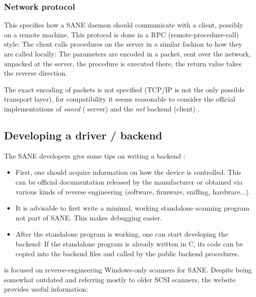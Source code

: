 \documentclass{article}
\begin{document}
\cite[4.4]{sane_standard}

\subsubsection{Network protocol}

This specifies how a SANE daemon should communicate with a client, possibly on a
remote machine. This protocol is done in a RPC (remote-procedure-call) style:
The client calls procedures on the server in a similar fashion to how they are
called locally: The parameters are encoded in a packet, sent over the network,
unpacked at the server, the procedure is executed there, the return value takes
the reverse direction.

The exact encoding of packets is not specified (TCP/IP is not the only possible
transport layer), for compatibility it seems reasonable to consider the official
implementations of {\it saned} ( server) and the {\it net} backend (client) .

\cite[5]{sane_standard}

\subsection{Developing a driver / backend}

The SANE developers give some tips on writing a backend \cite{sane_develop}:

\begin{itemize}
  \item First, one should acquire information on how the device is controlled. This
        can be official documentation released by the manufacturer or obtained via
        various kinds of reverse engineering (software, firmware, sniffing, hardware...).
  \item It is advisable to first write a minimal, working standalone scanning program not part of SANE.
        This makes debugging easier.
  \item After the standalone program is working, one can start developing the backend:
        If the standalone program is already written in C, its code can be copied
        into the backend files and called by the public backend procedures.
\end{itemize}

\cite{sane_develop_re} is focused on reverse-engineering
Windows-only scanners for SANE. Despite being somewhat outdated and referring mostly
to older SCSI scanners, the website provides useful information:
\end{document}
